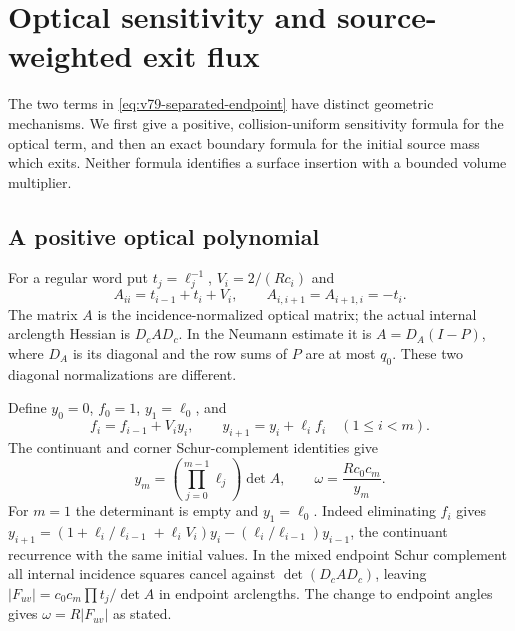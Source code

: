 \section{Optical sensitivity and source-weighted exit flux}
\label{sec:v79-optical-flux}
The two terms in \eqref{eq:v79-separated-endpoint} have distinct
geometric mechanisms. We first give a positive, collision-uniform
sensitivity formula for the optical term, and then an exact boundary
formula for the initial source mass which exits. Neither formula
identifies a surface insertion with a bounded volume multiplier.

\subsection{A positive optical polynomial}
For a regular word put $t_j=\ell_j^{-1}$, $V_i=2/(Rc_i)$ and
\begin{equation}\label{eq:v79-optical-matrix}
 A_{ii}=t_{i-1}+t_i+V_i,\qquad A_{i,i+1}=A_{i+1,i}=-t_i.
\end{equation}
The matrix $A$ is the incidence-normalized optical matrix; the actual
internal arclength Hessian is $D_cAD_c$. In the Neumann estimate it
is $A=D_A(I-P)$, where $D_A$ is its diagonal and the row sums of $P$
are at most $q_0$. These two diagonal normalizations are different.

Define $y_0=0$, $f_0=1$, $y_1=\ell_0$, and
\begin{equation}\label{eq:v79-positive-recursion}
 f_i=f_{i-1}+V_i y_i,\qquad y_{i+1}=y_i+\ell_i f_i\quad(1\le i<m).
\end{equation}
The continuant and corner Schur-complement identities give
\begin{equation}\label{eq:v79-optical-denominator}
 y_m=\left(\prod_{j=0}^{m-1}\ell_j\right)\det A,
 \qquad \omega=\frac{R c_0c_m}{y_m}.
\end{equation}
For $m=1$ the determinant is empty and $y_1=\ell_0$.
Indeed eliminating $f_i$ gives
$y_{i+1}=(1+\ell_i/\ell_{i-1}+\ell_iV_i)y_i
-(\ell_i/\ell_{i-1})y_{i-1}$, the continuant recurrence with the same
initial values. In the mixed endpoint Schur complement all internal
incidence squares cancel against $\det(D_cAD_c)$, leaving
$|F_{uv}|=c_0c_m\prod t_j/\det A$ in endpoint arclengths. The change
to endpoint angles gives $\omega=R|F_{uv}|$ as stated.

